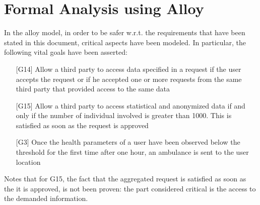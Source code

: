 \section{Formal Analysis using Alloy}
In the alloy model, in order to be safer w.r.t. the requirements that have been stated in this document, critical aspects have been modeled. 
In particular, the following vital goals have been asserted:
\begin{enumerate}
\item[{[G14]}]  Allow a third party to access data specified in a request if the user accepts the request or if he accepted one or more requests from the same third party that provided access to the same data 
\item[{[G15]}] Allow a third party to access statistical and anonymized data if and only if the number of individual involved is greater than 1000. This is satisfied as soon as the request is approved  
\item[{[G3]}] Once the health parameters of a user have been observed below the threshold for the first time after one hour, an ambulance is sent to the user location
\end{enumerate}

Notes that for G15, the fact that the aggregated request is satisfied as soon as the it is approved, is not been proven: the part considered critical is the access to the demanded information. \\

